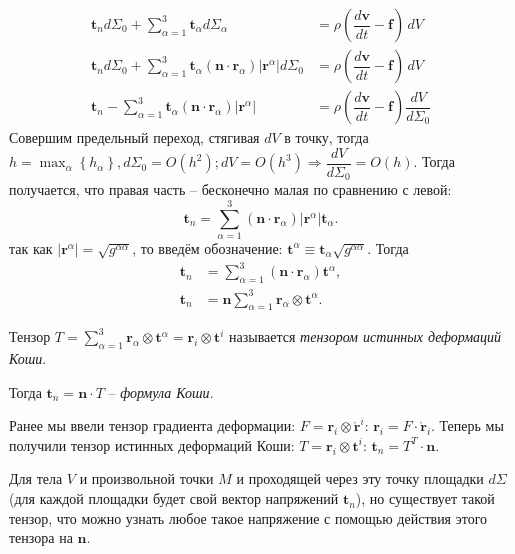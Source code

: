 \begin{align*}
  \mathbf{t}_n d\Sigma_0 + \sum_{\alpha=1}^3 \mathbf{t}_\alpha d\Sigma_\alpha
  &= \rho \left( \dfrac{d\mathbf{v}}{dt} - \mathbf{f} \right) \, dV \\
  \mathbf{t}_n d\Sigma_0
  + \sum_{\alpha=1}^3 \mathbf{t}_\alpha (\mathbf{n} \cdot \mathbf{r}_\alpha) |\mathbf{r}^\alpha| d\Sigma_0 &= \rho \left( \dfrac{d\mathbf{v}}{dt} - \mathbf{f} \right) \, dV \\
  \mathbf{t}_n - \sum_{\alpha=1}^3 \mathbf{t}_\alpha (\mathbf{n} \cdot \mathbf{r}_\alpha) |\mathbf{r}^\alpha| &= \rho \left( \dfrac{d\mathbf{v}}{dt} - \mathbf{f} \right) \dfrac{dV}{d\Sigma_0}
\end{align*}
Совершим предельный переход, стягивая $dV$ в точку, тогда
$h=\max_\alpha \left\{ h_\alpha \right\} , d\Sigma_0 = O(h^2);
dV = O(h^3) \Rightarrow \dfrac{dV}{d\Sigma_0} = O(h)$. Тогда получается, что
правая часть -- бесконечно малая по сравнению с левой:
\[
  \mathbf{t}_n = \sum_{\alpha=1}^3 (\mathbf{n} \cdot \mathbf{r}_\alpha) |\mathbf{r}^\alpha| \mathbf{t}_\alpha.
\]
так как $|\mathbf{r}^\alpha| = \sqrt{g^{\alpha\alpha}}$, то введём обозначение:
$\mathbf{t}^\alpha \equiv \mathbf{t}_\alpha \sqrt{g^{\alpha\alpha}}$. Тогда
\begin{align*}
  \mathbf{t}_n
  &= \sum_{\alpha=1}^3 (\mathbf{n} \cdot \mathbf{r}_\alpha) \mathbf{t}^\alpha, \\
  \mathbf{t}_n
  &= \mathbf{n} \sum_{\alpha=1}^3 \mathbf{r}_\alpha \otimes \mathbf{t}^\alpha.
\end{align*}

Тензор $T = \sum_{\alpha=1}^3 \mathbf{r}_\alpha \otimes \mathbf{t}^\alpha
= \mathbf{r}_i \otimes \mathbf{t}^i$ называется \emph{тензором истинных
деформаций Коши}.

Тогда $\mathbf{t}_n = \mathbf{n} \cdot T$ -- \emph{формула Коши}.

\begin{remark}
  Ранее мы ввели тензор градиента деформации:
  $F = \mathbf{r}_i \otimes \mathring{\mathbf{r}}^i$: $\mathbf{r}_i = F \cdot \mathring{\mathbf{r}}_i$.
  Теперь мы получили тензор истинных деформаций Коши:
  $T = \mathbf{r}_i \otimes \mathbf{t}^i$: $\mathbf{t}_n = T^T \cdot \mathbf{n}$.
\end{remark}

\begin{remark}
  Для тела $V$ и произвольной точки $M$ и проходящей через эту точку площадки
  $d\Sigma$ (для каждой площадки будет свой вектор напряжений $\mathbf{t}_n$),
  но существует такой тензор, что можно узнать любое такое напряжение 
  с помощью действия этого тензора на $\mathbf{n}$.
\end{remark}

